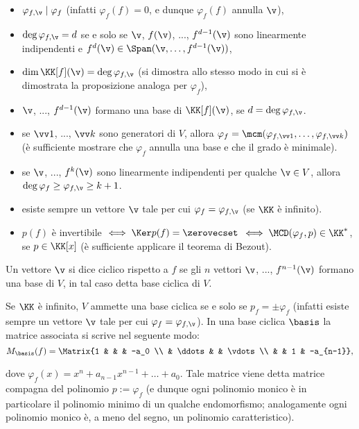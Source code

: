 \documentclass[10pt,landscape]{article}
\begin{document}
\begin{multicols}{3}
		\begin{itemize}
			\item $\varphi_{f, \v} \mid \varphi_f$ (infatti $\varphi_f(f)=0$, e dunque $\varphi_f(f)$ annulla $\v$),
			\item $\deg \varphi_{f, \v} = d$ se e solo se $\v$, $f(\v)$, ..., $f^{d-1}(\v)$ sono linearmente indipendenti
			e $f^d(\v) \in \Span(\v, \ldots, f^{d-1}(\v))$,
			\item $\dim \KK[f](\v) = \deg \varphi_{f, \v}$ (si dimostra allo stesso modo in cui si è dimostrata la proposizione analoga per $\varphi_f$),
			\item $\v$, ..., $f^{d-1}(\v)$ formano una base
			di $\KK[f](\v)$, se $d = \deg \varphi_{f, \v}$.
			\item se $\vv 1$, ..., $\vv k$ sono generatori
			di $V$, allora $\varphi_f = \mcm(\varphi_{f, \vv 1}, \ldots, \varphi_{f, \vv k})$ (è sufficiente mostrare
			che $\varphi_f$ annulla una base e che il grado è minimale).
			\item se $\v$, ..., $f^{k}(\v)$ sono linearmente indipendenti per qualche $\v \in V$, allora $\deg \varphi_f \geq \varphi_{f, \v} \geq k + 1$.
			\item esiste sempre un vettore $\v$ tale per cui
			$\varphi_f = \varphi_{f, \v}$ (se $\KK$ è infinito).
			\item $p(f)$ è invertibile $\iff \Ker p(f) = \zerovecset$ $\iff \MCD(\varphi_f, p) \in \KK^*$, se $p \in \KK[x]$ (è sufficiente
			applicare il teorema di Bezout).
		\end{itemize}
		
		Un vettore $\v$ si dice ciclico rispetto a $f$ se
		gli $n$ vettori $\v$, ..., $f^{n-1}(\v)$ formano
		una base di $V$, in tal caso detta base ciclica
		di $V$.
		
		Se $\KK$ è infinito, $V$ ammette una base ciclica se e solo se $p_f = \pm \varphi_f$ (infatti esiste sempre un vettore $\v$ tale per cui $\varphi_f = \varphi_{f, \v}$). In
		una base ciclica $\basis$ la matrice associata si
		scrive nel seguente modo:
		\[ M_\basis(f) = \Matrix{1 & & & -a_0 \\ & \ddots & & \vdots \\ & & 1 & -a_{n-1}}, \]
		
		dove $\varphi_f(x) = x^n + a_{n-1} x^{n-1} + \ldots + a_0$.
		Tale matrice viene detta matrice compagna del polinomio
		$p := \varphi_f$ (e dunque ogni polinomio monico è in particolare
		il polinomio minimo di un qualche endomorfismo; analogamente
		ogni polinomio monico è, a meno del segno, un polinomio
		caratteristico).
		

\end{multicols}
\end{document}
